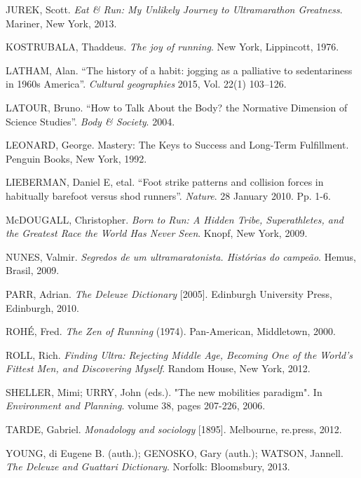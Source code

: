 \begin{thebibliography}{99\kern\bibindent}
\bibitem{} JUREK, Scott. \textit{Eat & Run: My Unlikely Journey to Ultramarathon Greatness}. Mariner,
New York, 2013.

\bibitem{} KOSTRUBALA, Thaddeus. \textit{The joy of running}. New York, Lippincott, 1976.

\bibitem{} LATHAM, Alan. 
“The history of a habit: jogging as a palliative to sedentariness in 1960s America”. \textit{Cultural geographies} 2015, Vol. 22(1) 103–126.

\bibitem{} LATOUR, Bruno. “How to Talk About the Body? the Normative Dimension of Science Studies”. \textit{Body \& Society}. 2004.

\bibitem{} LEONARD, George. Mastery: The Keys to Success and Long-Term Fulfillment. Penguin
Books, New York, 1992.

\bibitem{} LIEBERMAN, Daniel E, etal. 
``Foot strike patterns and collision forces in habitually barefoot versus shod runners''. \textit{Nature}. 28 January 2010. Pp. 1-6.


\bibitem{} McDOUGALL, Christopher. \textit{Born to Run: A Hidden Tribe, Superathletes, and the Greatest Race the World Has Never Seen}. Knopf, New York, 2009.

\bibitem{} NUNES, Valmir. \textit{Segredos de um ultramaratonista. Histórias do campeão}. Hemus, Brasil,
2009.

\bibitem{} PARR, Adrian. \textit{The Deleuze Dictionary} [2005]. Edinburgh University Press, Edinburgh, 2010.

\bibitem{} ROHÉ, Fred. \textit{The Zen of Running} (1974). Pan-American, Middletown, 2000.

\bibitem{} ROLL, Rich. \textit{Finding Ultra: Rejecting Middle Age, Becoming One of the World’s Fittest
Men, and Discovering Myself}. Random House, New York, 2012.

\bibitem{} SHELLER, Mimi; URRY, John (eds.). "The new mobilities paradigm". In \textit{Environment and Planning}. volume 38, pages 207-226, 2006. %

\bibitem{} TARDE, Gabriel. 
\textit{Monadology and sociology} [1895]. Melbourne, re.press, 2012.

\bibitem{} YOUNG, di Eugene B. (auth.); GENOSKO, Gary (auth.); WATSON, Jannell. 
\textit{The Deleuze and Guattari Dictionary}. Norfolk: Bloomsbury, 2013.

\end{thebibliography}
